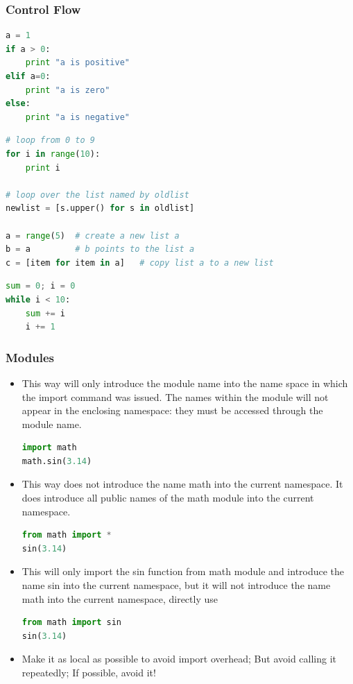 \begin{frame}[fragile]
  \MyLogo
  \frametitle{Control Flow}  
\small

\medskip
{}
\begin{lstlisting}[language=python]
a = 1
if a > 0:
	print "a is positive"
elif a=0:
	print "a is zero"
else:
	print "a is negative"
\end{lstlisting}			

\begin{lstlisting}[language=python]
# loop from 0 to 9
for i in range(10):
	print i
	
# loop over the list named by oldlist
newlist = [s.upper() for s in oldlist]

a = range(5)  # create a new list a
b = a         # b points to the list a
c = [item for item in a]   # copy list a to a new list
\end{lstlisting}	
	
\begin{lstlisting}[language=python]
sum = 0; i = 0
while i < 10:
	sum += i
	i += 1
\end{lstlisting}

\end{frame}


\begin{frame}[fragile]
  \MyLogo
  \frametitle{Modules}  
\small		

\begin{itemize}
\item This way will only introduce the module name into the name space in which the import command was issued. The names within the module will not appear in the enclosing namespace: they must be accessed through the module name.
\begin{lstlisting}[language=python,numbers=none] 
import math
math.sin(3.14)
\end{lstlisting}

\item This way does not introduce the name math into the current namespace. It does  introduce all public names of the math module into the current namespace.\begin{lstlisting}[language=python,numbers=none] 
from math import *
sin(3.14)
\end{lstlisting}

\item This will only import the sin function from math module and introduce the name sin into the current namespace, but it will not introduce the name math into the current namespace, directly use
\begin{lstlisting}[language=python,numbers=none] 
from math import sin
sin(3.14)
\end{lstlisting}

\item Make it as local as possible to avoid import overhead; But avoid calling it repeatedly; If possible, avoid it!
\end{itemize}

\end{frame}

